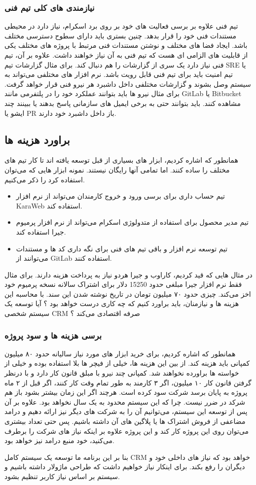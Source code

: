 \subsubsection{نیازمندی های کلی تیم فنی}
تیم فنی علاوه بر برسی فعالیت های خود بر روی برد اسکرام، نیاز دارد در محیطی مستندات فنی خود را قرار بدهد. چنین بستری باید دارای سطوح دسترسی مختلف باشد.
ایجاد فضا های مختلف و نوشتن مستندات فنی مرتبط با پروژه های مختلف یکی از قابلیت های الزامی ای هست که تیم فنی به آن نیاز خواهند داشت.
علاوه بر آن، تیم فنی نیاز دارد یک سری از گزارشات را هم دنبال کند. برای مثال گزارشات تیم SRE یا تیم امنیت باید برای تیم فنی قابل رویت باشد.
نرم افزار های مختلفی می‌تواند به سیستم وصل بشوند و گزارشات مختلفی داخل داشبرد هر نیرو فنی قرار خواهد گرفت.
برای مثال نیرو ها باید بتوانند عملکرد خود را در پلتفرمی مانند GitLab یا Bitbucket مشاهده کنند.
باید بتوانند حتی به برخی ایمیل های سازمانی پاسخ بدهند یا ببینند چند ایشو یا PR باز داخل داشبرد خود دارند.


\subsection{براورد هزینه ها}
همانطور که اشاره کردیم، ابزار های بسیاری از قبل توسعه یافته اند تا کار تیم های مختلف را ساده کنند. اما تمامی آنها رایگان نیستند.
نمونه ابزار هایی که می‌توان استفاده کرد را ذکر می‌کنیم.

\begin{itemize}
	\item تیم حساب داری برای برسی ورود و خروج کارمندان می‌تواند از نرم افزار KaraWeb استفاده کند.
	\item تیم مدیر محصول برای استفاده از متدولوژی اسکرام می‌تواند از نرم افزار پرمیوم جیرا استفاده کند.
	\item تیم توسعه نرم افزار و باقی تیم های فنی برای نگه داری کد ها و مستندات می‌توانند از GitLab استفاده کنند.
\end{itemize}

در مثال هایی که قید کردیم، کاراوب و جیرا هردو نیاز به پرداخت هزینه دارند.
برای مثال فقط نرم افزار جیرا مبلغی حدود 15250 دلار برای اشتراک سالانه نسخه پرمیوم خود اخز می‌کند. چیزی حدود ۷۰ میلیون تومان در تاریخ نوشته شدن این سند.
با محاسبه این هزینه ها و نیازمنان، باید براورد کنیم که چه کاری درست خواهد بود ؟
آیا توسعه یک سیستم شخصی CRM صرفه اقتصادی می‌کند ؟

\subsubsection{برسی هزینه ها و سود پروژه}
همانطور که اشاره کردیم، برای خرید ابزار های مورد نیاز سالیانه حدود ۸۰ میلیون کمپانی باید هزینه کند. از بین این هزینه ها، خیلی از فیچر ها بلا استفاده بوده
و خیلی از خواسته ها براورده نخواهند شد.
کمپانی چند نیرو با مبلق قانون کار دارد و با درنظر گرفتن قانون کار ۱۰ میلیون، اگر ۳ کارمند به طور تمام وقت کار کنند، اگر قبل از ۲ ماه پروژه به پایان برسد شرکت سود کرده است.
هرچند اگر این زمان بیشتر بشود باز هم شرکد در ضرر نیست. چرا که این سیستم محدود به یک سال نخواهد بود.
علاوه بر آن پس از توسعه این سیستم، می‌توانیم آن را به شرکت های دیگر نیز ارائه دهیم و درامد مضاعفی از فروش اشتراک ها یا پلاگین های آن داشته باشیم.
پس حتی تعداد بیشتری می‌توان روی این پروژه کار کند و این پروژه علاوه بر اینکه نیاز های شرکت را برطرف می‌کنید، خود منبع درامد نیز خواهد بود.

بنا بر این برنامه ما توسعه یک سیستم کامل CRM خواهد بود که نیاز های داخلی خود و دیگران را رفع بکند.
برای اینکار نیاز خواهیم داشت که طراحی ماژولار داشته باشیم و سیستم بر اساس نیاز کاربر تنظیم بشود.
